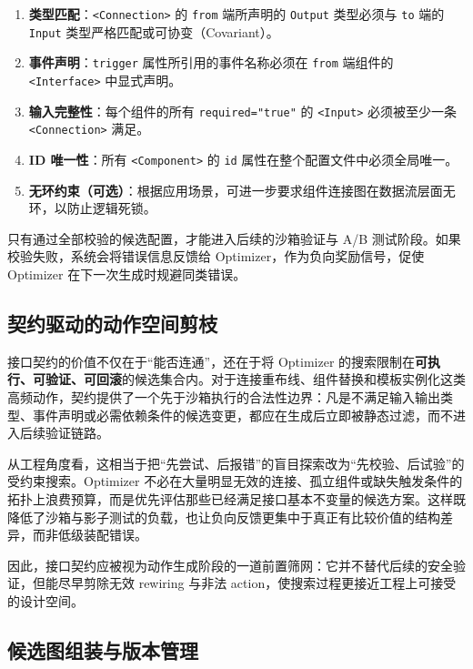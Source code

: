 \begin{enumerate}[label=\textbf{规则\arabic*:}]
    \item \textbf{类型匹配}：\texttt{<Connection>} 的 \texttt{from} 端所声明的 \texttt{Output} 类型必须与 \texttt{to} 端的 \texttt{Input} 类型严格匹配或可协变（Covariant）。
    \item \textbf{事件声明}：\texttt{trigger} 属性所引用的事件名称必须在 \texttt{from} 端组件的 \texttt{<Interface>} 中显式声明。
    \item \textbf{输入完整性}：每个组件的所有 \texttt{required="true"} 的 \texttt{<Input>} 必须被至少一条 \texttt{<Connection>} 满足。
    \item \textbf{ID 唯一性}：所有 \texttt{<Component>} 的 \texttt{id} 属性在整个配置文件中必须全局唯一。
    \item \textbf{无环约束（可选）}：根据应用场景，可进一步要求组件连接图在数据流层面无环，以防止逻辑死锁。
\end{enumerate}

只有通过全部校验的候选配置，才能进入后续的沙箱验证与 A/B 测试阶段。如果校验失败，系统会将错误信息反馈给 Optimizer，作为负向奖励信号，促使 Optimizer 在下一次生成时规避同类错误。

\subsection{契约驱动的动作空间剪枝}

接口契约的价值不仅在于“能否连通”，还在于将 Optimizer 的搜索限制在\textbf{可执行、可验证、可回滚}的候选集合内。对于连接重布线、组件替换和模板实例化这类高频动作，契约提供了一个先于沙箱执行的合法性边界：凡是不满足输入输出类型、事件声明或必需依赖条件的候选变更，都应在生成后立即被静态过滤，而不进入后续验证链路。

从工程角度看，这相当于把“先尝试、后报错”的盲目探索改为“先校验、后试验”的受约束搜索。Optimizer 不必在大量明显无效的连接、孤立组件或缺失触发条件的拓扑上浪费预算，而是优先评估那些已经满足接口基本不变量的候选方案。这样既降低了沙箱与影子测试的负载，也让负向反馈更集中于真正有比较价值的结构差异，而非低级装配错误。

因此，接口契约应被视为动作生成阶段的一道前置筛网：它并不替代后续的安全验证，但能尽早剪除无效 rewiring 与非法 action，使搜索过程更接近工程上可接受的设计空间。

\subsection{候选图组装与版本管理}

